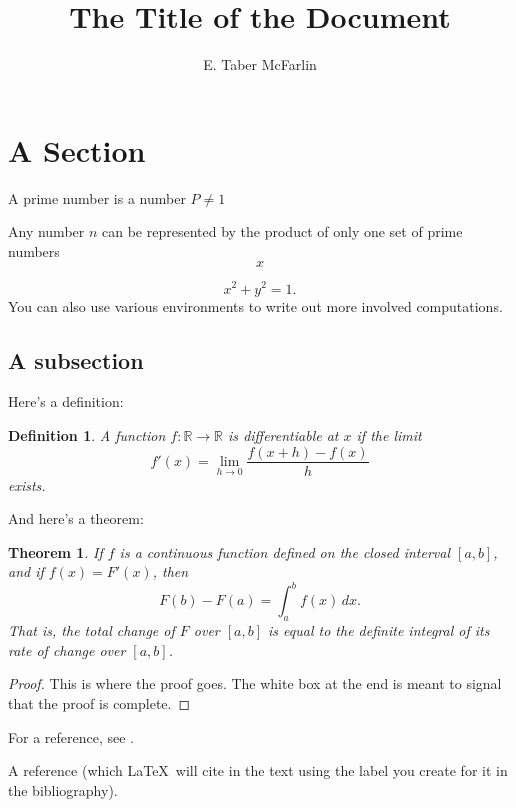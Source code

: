 \documentclass[12pt,a4paper,reqno,parskip=full]{amsart}
\numberwithin{equation}{section}
\theoremstyle{plain}
\newtheorem{theorem}[subsection]{Theorem}
\newtheorem{definition}[subsection]{Definition}
\theoremstyle{definition}
\def\R{{\mathbb R}}
\begin{document}
\title{The Title of the Document}

\author{E. Taber McFarlin}

\maketitle

\section{A Section}

A prime number is a number $P \neq 1$

Any number $n$ can be represented by the product of only one set of prime numbers
\[
x
 \] 

\[
x^2+y^2=1.
\]
You can also use various environments to write out more involved computations.

\subsection{A subsection}

Here's a definition:

\begin{definition}
A function $f:\R\to\R$ is \emph{differentiable at $x$} if the limit
\[
f'(x)=\lim_{h\to 0}\frac{f(x+h)-f(x)}{h}
\]
exists.
\end{definition}

And here's a theorem:

\begin{theorem}
If $f$ is a continuous function defined on the closed interval $[a,b]$, and if $f(x)=F'(x)$, then
\[
F(b)-F(a)=\int_a^bf(x)\,dx.
\]
That is, the total change of $F$ over $[a,b]$ is equal to the definite integral of its rate of change over $[a,b]$.
\end{theorem}

\begin{proof}
This is where the proof goes. The white box at the end is meant to signal that the proof is complete.
\end{proof}

For a reference, see \cite{ref}.

\begin{thebibliography}{10}

 A reference (which \LaTeX\ will cite in the text using the label you create for it in the bibliography).

\end{thebibliography}
\end{document}
